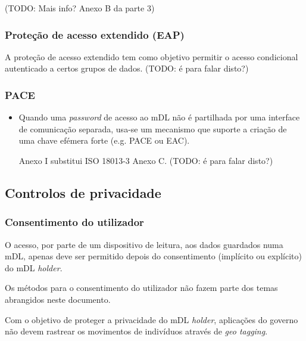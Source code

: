 (TODO: Mais info? Anexo B da parte 3)

\subsubsection{Proteção de acesso extendido (EAP)}
\label{sec:org6117d54}
A proteção de acesso extendido tem como objetivo permitir o acesso
condicional autenticado a certos grupos de dados.
(TODO: é para falar disto?)
\subsubsection{PACE}
\label{sec:org54755e3}
\begin{itemize}
\item Quando uma \emph{password} de acesso ao mDL não é partilhada por uma interface
de comunicação separada, usa-se um mecanismo que suporte a criação de uma
chave efémera forte (e.g. PACE ou EAC).

Anexo I substitui ISO 18013-3 Anexo C.
(TODO: é para falar disto?)
\end{itemize}

\subsection{Controlos de privacidade}
\label{sec:org1279156}
\subsubsection{Consentimento do utilizador}
\label{sec:orga2915d6}
O acesso, por parte de um dispositivo de leitura, aos dados guardados numa
mDL, apenas deve ser permitido depois do consentimento (implícito ou
explícito) do mDL \emph{holder}.

Os métodos para o consentimento do utilizador não fazem parte dos temas
abrangidos neste documento.

Com o objetivo de proteger a privacidade do mDL \emph{holder}, aplicações do
governo não devem rastrear os movimentos de indivíduos através de \emph{geo
tagging}.

